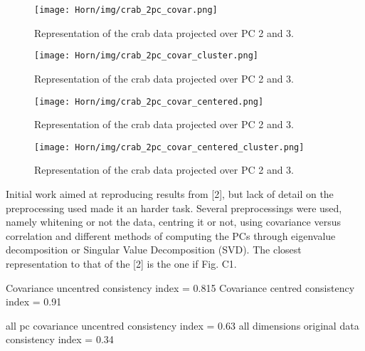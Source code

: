 \begin{figure}[hbtp]
\centering
\texttt{[image: Horn/img/crab\_2pc\_covar.png]}
\caption{Representation of the crab data projected over PC 2 and 3.}
\label{fig:crab_2pc_covar}
\end{figure}

\begin{figure}[hbtp]
\centering
\texttt{[image: Horn/img/crab\_2pc\_covar\_cluster.png]}
\caption{Representation of the crab data projected over PC 2 and 3.}
\label{fig:crab_2pc_covar_cluster}
\end{figure}

\begin{figure}[hbtp]
\centering
\texttt{[image: Horn/img/crab\_2pc\_covar\_centered.png]}
\caption{Representation of the crab data projected over PC 2 and 3.}
\label{fig:crab_2pc_covar_centered}
\end{figure}

\begin{figure}[hbtp]
\centering
\texttt{[image: Horn/img/crab\_2pc\_covar\_centered\_cluster.png]}
\caption{Representation of the crab data projected over PC 2 and 3.}
\label{fig:crab_2pc_covar_centered_cluster}
\end{figure}


Initial work aimed at reproducing results from [2], but lack of detail on the preprocessing used made it an harder task. Several preprocessings were used, namely whitening or not the data, centring it or not, using covariance versus correlation and different methods of computing the PCs through eigenvalue decomposition or Singular Value Decomposition (SVD). The closest representation to that of the [2] is the one if Fig. C1.




Covariance uncentred consistency index = 0.815
Covariance centred consistency index = 0.91

all pc covariance uncentred consistency index = 0.63
all dimensions original data consistency index = 0.34
